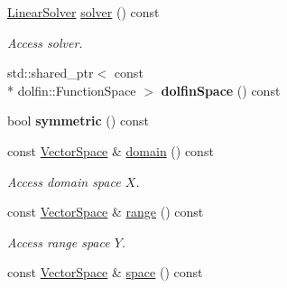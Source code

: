 \begin{DoxyCompactItemize}
\item 
\hyperlink{namespaceSpacy_adcd0d78166a9c972b8a2e5a689fc2d03}{Linear\-Solver} \hyperlink{classSpacy_1_1FEniCS_1_1LinearOperator_aa5aacfc25bb0d710f56c2323753d451f}{solver} () const 
\begin{DoxyCompactList}\small\item\em Access solver. \end{DoxyCompactList}\item 
\hypertarget{classSpacy_1_1FEniCS_1_1LinearOperator_a9edb2a6eac66a2379792ef5580fcae75}{std\-::shared\-\_\-ptr$<$ const \\*
dolfin\-::\-Function\-Space $>$ {\bfseries dolfin\-Space} () const }\label{classSpacy_1_1FEniCS_1_1LinearOperator_a9edb2a6eac66a2379792ef5580fcae75}

\item 
\hypertarget{classSpacy_1_1FEniCS_1_1LinearOperator_aa83aaeab285efbb5d636054d06550d64}{bool {\bfseries symmetric} () const }\label{classSpacy_1_1FEniCS_1_1LinearOperator_aa83aaeab285efbb5d636054d06550d64}

\item 
\hypertarget{classSpacy_1_1OperatorBase_a2588f9b3e0188820c4c494e63293dc6f}{const \hyperlink{classSpacy_1_1VectorSpace}{Vector\-Space} \& \hyperlink{classSpacy_1_1OperatorBase_a2588f9b3e0188820c4c494e63293dc6f}{domain} () const }\label{classSpacy_1_1OperatorBase_a2588f9b3e0188820c4c494e63293dc6f}

\begin{DoxyCompactList}\small\item\em Access domain space $X$. \end{DoxyCompactList}\item 
\hypertarget{classSpacy_1_1OperatorBase_ab19d3b7a6f290b1079248f1e567e53d6}{const \hyperlink{classSpacy_1_1VectorSpace}{Vector\-Space} \& \hyperlink{classSpacy_1_1OperatorBase_ab19d3b7a6f290b1079248f1e567e53d6}{range} () const }\label{classSpacy_1_1OperatorBase_ab19d3b7a6f290b1079248f1e567e53d6}

\begin{DoxyCompactList}\small\item\em Access range space $Y$. \end{DoxyCompactList}\item 
\hypertarget{classSpacy_1_1VectorBase_aa999dbf9d679d895dfe04c10fbf9f5e9}{const \hyperlink{classSpacy_1_1VectorSpace}{Vector\-Space} \& \hyperlink{classSpacy_1_1VectorBase_aa999dbf9d679d895dfe04c10fbf9f5e9}{space} () const }\label{classSpacy_1_1VectorBase_aa999dbf9d679d895dfe04c10fbf9f5e9}


\end{DoxyCompactItemize}
